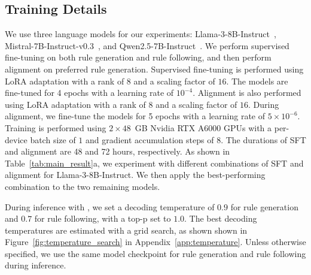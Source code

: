 \subsection{Training Details}
We use three language models for our experiments: Llama-3-8B-Instruct~\citep{grattafiori2024llama3herdmodels}, Mistral-7B-Instruct-v0.3~\citep{jiang2023mistral7b}, and Qwen2.5-7B-Instruct~\citep{bai2023qwentechnicalreport}. We perform supervised fine-tuning on both rule generation and rule following, and then perform alignment on preferred rule generation. Supervised fine-tuning is performed using LoRA adaptation with a rank of $8$ and a scaling factor of $16$. The models are fine-tuned for 4 epochs with a learning rate of $10^{-4}$. Alignment is also performed using LoRA adaptation with a rank of $8$ and a scaling factor of $16$. During alignment, we fine-tune the models for 5 epochs with a learning rate of $5\times 10^{-6}$. Training is performed using $2\times 48$~GB Nvidia RTX A6000 GPUs with a per-device batch size of $1$ and gradient accumulation steps of $8$. The durations of SFT and alignment are 48 and 72 hours, respectively. As shown in Table~\ref{tab:main_result}a, we experiment with different combinations of SFT and alignment for Llama-3-8B-Instruct. We then apply the best-performing combination to the two remaining models.

During inference with \proposed, we set a decoding temperature of $0.9$ for rule generation and $0.7$ for rule following, with a top-p set to $1.0$. The best decoding temperatures are estimated with a grid search, as shown shown in Figure~\ref{fig:temperature_search} in Appendix~\ref{app:temperature}. Unless otherwise specified, we use the same model checkpoint for rule generation and rule following during inference.


